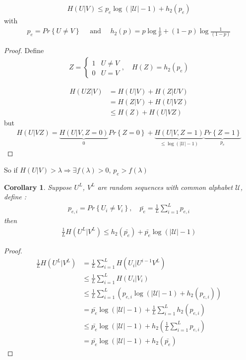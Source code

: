 \documentclass[twoside]{article}
\newtheorem{corollary}{Corollary}[theorem]
\theoremstyle{definition} %
\renewcommand{\Pr}[1]{Pr\left\{#1\right\}}
\def\U{\mathcal{U}}
\begin{document}
\begin{align*}
  H(U | V) \leq p_e \log(|\U| - 1) + h_2(p_e)
\end{align*}
with
\begin{align*}
  p_e = \Pr{U \neq V}
  \quad \text{ and } \quad
  h_2(p) = p \log \frac{1}{p} + (1 - p) \log \frac{1}{(1-p)}
\end{align*}

\begin{proof}
  Define
  \begin{align*}
    Z =
    \left\{
    \begin{array}{ll}
      1 & U \neq V \\
      0 & U = V
    \end{array}
    \right. , \quad
    H(Z) = h_2(p_e)
  \end{align*}

  \begin{align*}
    H(UZ | V) &= H(U|V) + H(Z | UV) \\
    &= H(Z | V) + H(U | VZ) \\
    &\leq H(Z) + H(U | VZ)
  \end{align*}
  but
  \begin{align*}
    H(U | VZ) = \underbrace{H(U | V, Z = 0)}_{0}\Pr{Z = 0} + \underbrace{H(U | V, Z = 1)}_{\leq \log(|\U| - 1)}\underbrace{\Pr{Z = 1}}_{p_e}
  \end{align*}
\end{proof}

So if $H(U|V) > \lambda \Rightarrow \exists f(\lambda) > 0$, $p_e > f(\lambda)$

\begin{corollary}
  Suppose $U^L$, $V^L$ are random sequences with common alphabet $\U$, define :
  \begin{align*}
    p_{e,i} = \Pr{U_i \neq V_i} , \quad
    \bar{p_e} = \frac{1}{L} \sum_{i = 1}^{L} p_{e,i}
  \end{align*}
  then
  \begin{align*}
    \frac{1}{L} H(U^L | V^L) \leq h_2(\bar{p_e}) + \bar{p_e} \log(|\U| - 1)
  \end{align*}
\end{corollary}

\begin{proof}
  \begin{align*}
    \frac{1}{L} H(U^L | V^L) &= \frac{1}{L} \sum_{i = 1}^{L} H(U_i | U^{i-1} V^L) \\
    &\leq \frac{1}{L} \sum_{i = 1}^{L} H(U_i | V_i) \\
    &\leq \frac{1}{L} \sum_{i = 1}^{L}(p_{e,i} \log(|\U| - 1) + h_2(p_{e, i})) \\
    &= \bar{p_e} \log(|\U| - 1) + \frac{1}{L} \sum_{i = 1}^L h_2(p_{e,i}) \\
    &\leq \bar{p_e} \log(|\U| - 1) + h_2(\frac{1}{L} \sum_{i = 1}^L p_{e,i}) \\
    &= \bar{p_e} \log(|\U| - 1) + h_2(\bar{p_e})
  \end{align*}
\end{proof}
\end{document}
